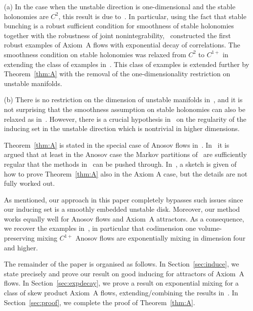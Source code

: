 \documentclass[12pt]{article}
\numberwithin{equation}{section}
\begin{document}
\begin{rmk}
(a) In the case when the unstable direction is one-dimensional and the stable holonomies are $C^2$, this result is due to~\cite{BaladiVallee05,AGY06,ABV16,ABV18}.
In particular, using the fact that stable bunching is a robust sufficient condition for smoothness of stable holonomies together with the robustness of joint nonintegrability,~\cite{ABV16} constructed the first robust examples of 
Axiom~A flows with exponential decay of correlations. 
The smoothness condition on stable holonomies was relaxed from $C^2$ to $C^{1+}$ in~\cite{AraujoM16} extending the class of examples in~\cite{ABV16}.
This class of examples is extended further by Theorem~\ref{thm:A} 
with the removal of the one-dimensionality restriction on unstable manifolds.

\vspace{1ex} \noindent
(b) There is no restriction on the dimension of unstable manifolds in~\cite{AGY06}, and it is not surprising that the smoothness assumption on stable holonomies can also be relaxed as in~\cite{AraujoM16}. 
However, there is a crucial hypothesis in~\cite{AGY06} on the regularity of the inducing set in the unstable direction which is nontrivial in higher dimensions.

Theorem~\ref{thm:A} is stated in the special case of Anosov flows in~\cite{ButterleyWar20}.
In~\cite[Appendix]{ButterleyWar20} it is argued that at least in the Anosov case the Markov partitions of~\cite{Ratner73b} are sufficiently regular that the methods in~\cite{AGY06} can be pushed through. 
In~\cite{ABV18}, a sketch is given of how to prove Theorem~\ref{thm:A} also in the Axiom A case, but the details are not fully worked out.

As mentioned, our approach in this paper completely bypasses such issues since our inducing set is a smoothly embedded unstable disk.
Moreover, our method works equally well for Anosov flows and Axiom~A attractors.
As a consequence, we recover the examples in~\cite{ButterleyWar20}, in particular that codimension one volume-preserving mixing $C^{1+}$ Anosov flows are exponentially mixing in dimension four and higher.
\end{rmk}

The remainder of the paper is organised as follows.
In Section~\ref{sec:induce}, we state precisely and prove our result on good inducing for attractors of Axiom~A flows.
In Section~\ref{sec:expdecay}, we prove a result on exponential mixing for a class of skew product Axiom~A flows, extending/combining the results in~\cite{AraujoM16,AGY06}.
In Section~\ref{sec:proof}, we complete the proof of Theorem~\ref{thm:A}.
\end{document}
